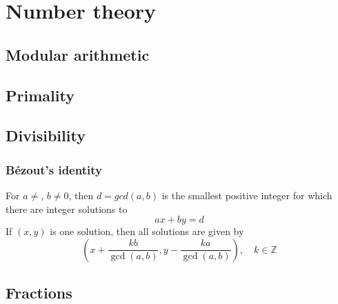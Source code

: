 \chapter{Number theory}

\section{Modular arithmetic}

\section{Primality}

\section{Divisibility}
	
	\subsection{Bézout's identity}
	For $a \neq $, $b \neq 0$, then $d=gcd(a,b)$ is the smallest positive integer for which there are integer solutions to
	$$ax+by=d$$
	If $(x,y)$ is one solution, then all solutions are given by
	$$\left(x+\frac{kb}{\gcd(a,b)}, y-\frac{ka}{\gcd(a,b)}\right), \quad k\in\mathbb{Z}$$


\section{Fractions}
